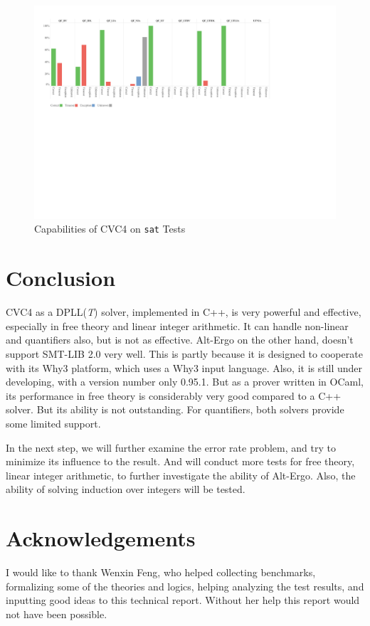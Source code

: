 \documentclass[10pt,twocolumn,letter]{article}
\theoremstyle{definition}
\begin{document}
\begin{figure}
\centering
\includegraphics[scale=0.45]{./testanalysis/satcap.pdf}
\caption{Capabilities of CVC4 on {\tt sat} Tests}
\label{f:satcap}
\end{figure}

\section{Conclusion}

CVC4 as a DPLL({\it T}) solver, implemented in C++, is very powerful and effective, especially in free theory and linear integer arithmetic. It can handle non-linear and quantifiers also, but is not as effective. Alt-Ergo on the other hand, doesn't support SMT-LIB 2.0 very well. This is partly because it is designed to cooperate with its Why3 platform, which uses a Why3 input language. Also, it is still under developing, with a version number only 0.95.1. But as a prover written in OCaml, its performance in free theory is considerably very good compared to a C++ solver. But its ability is not outstanding. For quantifiers, both solvers provide some limited support.

In the next step, we will further examine the error rate problem, and try to minimize its influence to the result. And will conduct more tests for free theory, linear integer arithmetic, to further investigate the ability of Alt-Ergo. Also, the ability of solving induction over integers will be tested.

\section{Acknowledgements}

I would like to thank Wenxin Feng, who helped collecting benchmarks, formalizing some of the theories and logics, helping analyzing the test results, and inputting good ideas to this technical report. Without her help this report would not have been possible.












\end{document}
